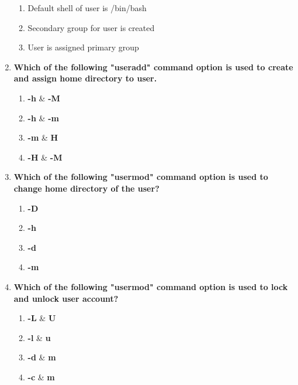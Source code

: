 \begin{flushleft}
\begin{enumerate}
\begin{enumerate}[label=(\alph*)]
			\item Default shell of user is /bin/bash    %
			\item Secondary group for user is created
			\item User is assigned primary group    %
		\end{enumerate}
		\bigskip
		\bigskip
		\item \textbf{Which of the following "useradd" command option is used to create and assign home directory to user.}
		\begin{enumerate}[label=(\alph*)]
			\item \textbf{-h} \& \textbf{-M}
			\item \textbf{-h} \& \textbf{-m}   %
			\item \textbf{-m} \& \textbf{H}
			\item \textbf{-H} \& \textbf{-M}
		\end{enumerate}
		\bigskip
		\bigskip
		\item \textbf{Which of the following "usermod" command option is used to change home directory of the user?}
		\begin{enumerate}[label=(\alph*)]
			\item \textbf{-D}
			\item \textbf{-h}
			\item \textbf{-d}   %
			\item \textbf{-m}
		\end{enumerate}
		\bigskip
		\bigskip
		\newpage
		\item \textbf{Which of the following "usermod" command option is used to lock and unlock user account?}
		\begin{enumerate}[label=(\alph*)]
			\item \textbf{-L} \& \textbf{U}  %
			\item \textbf{-l} \& \textbf{u} 
			\item \textbf{-d} \& \textbf{m}  
			\item \textbf{-c} \& \textbf{m}
		\end{enumerate}
	\end{enumerate}
	
	
\end{flushleft}
\newpage

